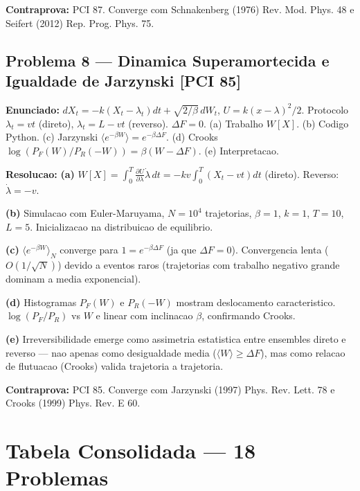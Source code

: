\documentclass[12pt,a4paper,oneside]{article}
\begin{document}
\textbf{Contraprova:} PCI 87. Converge com Schnakenberg (1976) Rev. Mod. Phys. 48 e Seifert (2012) Rep. Prog. Phys. 75.

\subsection{Problema 8 — Dinamica Superamortecida e Igualdade de Jarzynski [PCI 85]}
\textbf{Enunciado:} $dX_t=-k(X_t-\lambda_t)dt+\sqrt{2/\beta}\,dW_t$, $U=k(x-\lambda)^2/2$.
Protocolo $\lambda_t=vt$ (direto), $\lambda_t=L-vt$ (reverso). $\Delta F=0$.
(a) Trabalho $W[X]$. (b) Codigo Python. (c) Jarzynski $\langle e^{-\beta W}\rangle=e^{-\beta\Delta F}$.
(d) Crooks $\log(P_F(W)/P_R(-W))=\beta(W-\Delta F)$. (e) Interpretacao.

\textbf{Resolucao:}
\textbf{(a)} $W[X]=\int_0^T\frac{\partial U}{\partial\lambda}\dot\lambda\,dt=-kv\int_0^T(X_t-vt)dt$ (direto). Reverso: $\dot\lambda=-v$.

\textbf{(b)} Simulacao com Euler-Maruyama, $N=10^4$ trajetorias, $\beta=1$, $k=1$, $T=10$, $L=5$. Inicializacao na distribuicao de equilibrio.

\textbf{(c)} $\langle e^{-\beta W}\rangle_N$ converge para $1=e^{-\beta\Delta F}$ (ja que $\Delta F=0$). Convergencia lenta ($O(1/\sqrt{N})$) devido a eventos raros (trajetorias com trabalho negativo grande dominam a media exponencial).

\textbf{(d)} Histogramas $P_F(W)$ e $P_R(-W)$ mostram deslocamento caracteristico. $\log(P_F/P_R)$ vs $W$ e linear com inclinacao $\beta$, confirmando Crooks.

\textbf{(e)} Irreversibilidade emerge como assimetria estatistica entre ensembles direto e reverso — nao apenas como desigualdade media ($\langle W\rangle\geq\Delta F$), mas como relacao de flutuacao (Crooks) valida trajetoria a trajetoria.

\textbf{Contraprova:} PCI 85. Converge com Jarzynski (1997) Phys. Rev. Lett. 78 e Crooks (1999) Phys. Rev. E 60.

\section{Tabela Consolidada — 18 Problemas}
\end{document}
